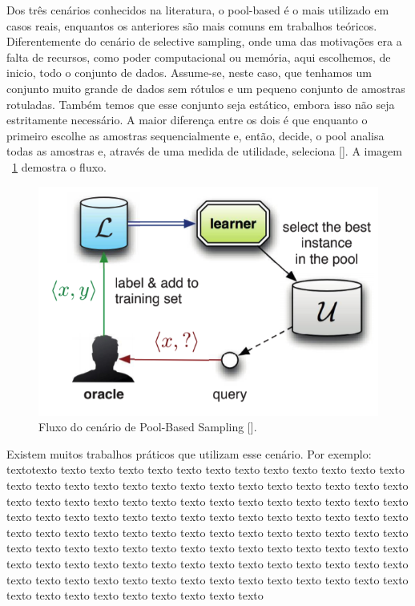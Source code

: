 Dos três cenários conhecidos na literatura, o pool-based é o mais utilizado em casos reais, enquantos os anteriores são mais comuns em trabalhos teóricos. Diferentemente do cenário de selective sampling, onde uma das motivações era a falta de recursos, como poder computacional ou memória, aqui escolhemos, de inicio, todo o conjunto de dados. Assume-se, neste caso, que tenhamos um conjunto muito grande de dados sem rótulos e um pequeno conjunto de amostras rotuladas. Também temos que esse conjunto seja estático, embora isso não seja estritamente necessário. A maior diferença entre os dois é que enquanto o primeiro escolhe as amostras sequencialmente e, então, decide, o pool analisa todas as amostras e, através de uma medida de utilidade, seleciona [\cite{settles2014active}]. A imagem ~\ref{fig:settles_2014_pool}  demostra o fluxo.

\begin{figure}
  \centering
  \includegraphics[width=.5\textwidth]{figures/settles_2014_pool.png}
  \caption{Fluxo do cenário de Pool-Based Sampling [\cite{settles2014active}].}
  \label{fig:settles_2014_pool}
\end{figure}

Existem muitos trabalhos práticos que utilizam esse cenário. Por exemplo:  textotexto texto texto texto texto texto texto texto texto texto texto texto texto texto texto texto texto texto texto texto texto texto texto texto texto texto texto texto texto texto texto texto texto texto texto texto texto texto texto texto texto texto texto texto texto texto texto texto texto texto texto texto texto texto texto texto texto texto texto texto texto texto texto texto texto texto texto texto texto texto texto texto texto texto texto texto texto texto texto texto texto texto texto texto texto texto texto texto texto texto texto texto texto texto texto texto texto texto texto texto texto texto texto texto texto texto texto texto texto texto texto texto texto texto texto texto texto texto texto texto



